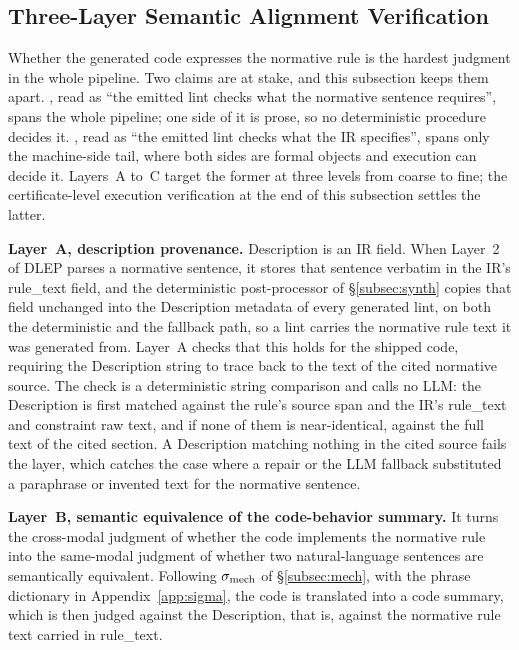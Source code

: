 \subsection{Three-Layer Semantic Alignment Verification}
\label{subsec:exec-verify}

Whether the generated code expresses the normative rule is the hardest judgment
in the whole pipeline. Two claims are at stake, and this subsection keeps them
apart. \CodeEqRule{}, read as ``the emitted lint checks what the normative
sentence requires'', spans the whole pipeline; one side of it is prose, so no
deterministic procedure decides it. \CodeEqIR{}, read as ``the emitted lint
checks what the IR specifies'', spans only the machine-side tail,
where both sides are formal objects and execution can decide it. Layers~A to~C
target the former at three levels from coarse to fine; the certificate-level
execution verification at the end of this subsection settles the latter.

\textbf{Layer~A, description provenance.} Description is an IR field. When Layer~2 of DLEP parses a normative sentence, it stores that
sentence verbatim in the IR's rule\_text field, and the deterministic
post-processor of \S\ref{subsec:synth} copies that field unchanged into the
Description metadata of every generated lint, on both the deterministic and the
fallback path, so a lint carries the normative rule
text it was generated from. Layer~A checks that this holds for the shipped
code, requiring the Description string to trace back to the text of the cited
normative source. The check is a deterministic string comparison and calls no
LLM: the Description is first matched against the rule's source span and the
IR's rule\_text and constraint raw text, and if none of them is near-identical,
against the full text of the cited section. A Description
matching nothing in the cited source fails the layer, which catches the case
where a repair or the LLM fallback substituted a paraphrase or invented text for
the normative sentence.

\textbf{Layer~B, semantic equivalence of the code-behavior summary.} It turns
the cross-modal judgment of whether the code implements the
normative rule into the same-modal judgment of whether two natural-language
sentences are semantically equivalent. Following $\sigma_{\mathrm{mech}}$ of \S\ref{subsec:mech}, with the
phrase dictionary in Appendix~\ref{app:sigma}, the code is translated into a
code summary, which is then judged against the Description, that is, against the
normative rule text carried in rule\_text.

